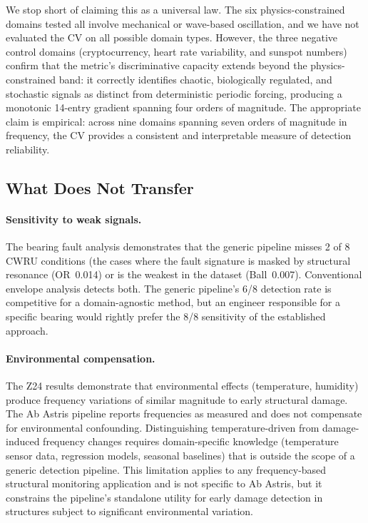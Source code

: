 \documentclass[11pt,a4paper]{article}
\begin{document}
We stop short of claiming this as a universal law. The six physics-constrained domains tested all involve mechanical or wave-based oscillation, and we have not evaluated the CV on all possible domain types. However, the three negative control domains (cryptocurrency, heart rate variability, and sunspot numbers) confirm that the metric's discriminative capacity extends beyond the physics-constrained band: it correctly identifies chaotic, biologically regulated, and stochastic signals as distinct from deterministic periodic forcing, producing a monotonic 14-entry gradient spanning four orders of magnitude. The appropriate claim is empirical: across nine domains spanning seven orders of magnitude in frequency, the CV provides a consistent and interpretable measure of detection reliability.

\subsection{What Does Not Transfer}
\label{sec:limitations-transfer}

\paragraph{Sensitivity to weak signals.} The bearing fault analysis demonstrates that the generic pipeline misses 2 of 8 CWRU conditions (the cases where the fault signature is masked by structural resonance (OR~0.014\textquotedbl{}) or is the weakest in the dataset (Ball~0.007\textquotedbl{}). Conventional envelope analysis detects both. The generic pipeline's 6/8 detection rate is competitive for a domain-agnostic method, but an engineer responsible for a specific bearing would rightly prefer the 8/8 sensitivity of the established approach.

\paragraph{Environmental compensation.} The Z24 results demonstrate that environmental effects (temperature, humidity) produce frequency variations of similar magnitude to early structural damage. The Ab Astris pipeline reports frequencies as measured and does not compensate for environmental confounding. Distinguishing temperature-driven from damage-induced frequency changes requires domain-specific knowledge (temperature sensor data, regression models, seasonal baselines) that is outside the scope of a generic detection pipeline. This limitation applies to any frequency-based structural monitoring application and is not specific to Ab Astris, but it constrains the pipeline's standalone utility for early damage detection in structures subject to significant environmental variation.
\end{document}
